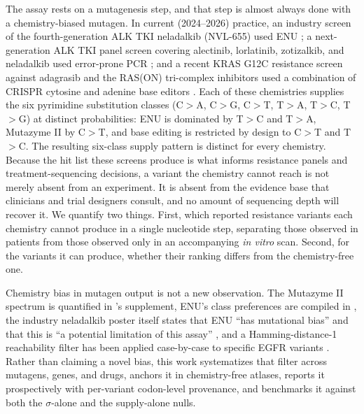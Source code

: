 \documentclass[11pt,a4paper]{article}
\begin{document}
The assay rests on a mutagenesis step, and that step is almost always
done with a chemistry-biased mutagen. In current (2024--2026) practice,
an industry screen of the fourth-generation ALK TKI neladalkib (NVL-655)
used ENU \citep{tangpeerachaikul2025}; a next-generation ALK TKI panel
screen covering alectinib, lorlatinib, zotizalkib, and neladalkib used
error-prone PCR \citep{takei2025}; and a recent KRAS G12C resistance
screen against adagrasib and the RAS(ON) tri-complex inhibitors used a
combination of CRISPR cytosine and adenine base editors
\citep{diaz2025}.
Each of these chemistries supplies the six pyrimidine substitution
classes (C$>$A, C$>$G, C$>$T, T$>$A, T$>$C, T$>$G) at distinct
probabilities: ENU is dominated by T$>$C and T$>$A, Mutazyme II by
C$>$T, and base editing is restricted by design to C$>$T and T$>$C.
The resulting six-class supply pattern is distinct for every chemistry.
Because the hit list these screens produce is what informs resistance
panels and treatment-sequencing decisions, a variant the chemistry
cannot reach is not merely absent from an experiment. It is absent from
the evidence base that clinicians and trial designers consult, and no
amount of sequencing depth will recover it.
We quantify two things. First, which reported resistance variants each
chemistry cannot produce in a single nucleotide step, separating those
observed in patients from those observed only in an accompanying
\textit{in vitro} scan. Second, for the variants it can produce,
whether their ranking differs from the chemistry-free one.

Chemistry bias in mutagen output is not a new observation. The
Mutazyme II spectrum is quantified in \citep{doi2022}'s supplement,
ENU's class preferences are compiled in \citep{arnold2012}, the
industry neladalkib poster itself states that ENU ``has mutational
bias'' and that this is ``a potential limitation of this assay''
\citep{tangpeerachaikul2025}, and a Hamming-distance-1 reachability
filter has been applied case-by-case to specific EGFR variants
\citep{wang2025}. Rather than claiming a novel bias, this work
systematizes that filter across mutagens, genes, and drugs, anchors
it in chemistry-free atlases, reports it prospectively with
per-variant codon-level provenance, and benchmarks it against both
the $\sigma$-alone and the supply-alone nulls.
\end{document}
